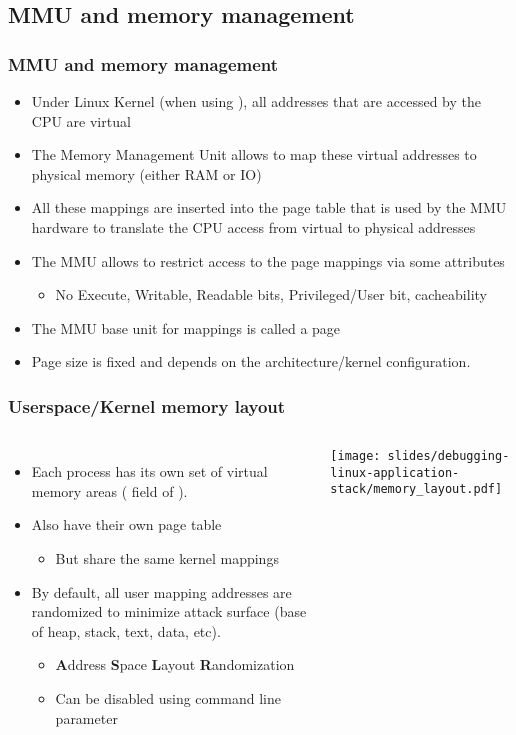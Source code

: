\subsection{MMU and memory management}

\begin{frame}
  \frametitle{MMU and memory management}
  \begin{itemize}
    \item Under Linux Kernel (when using ), all addresses
          that are accessed by the CPU are virtual
    \item The Memory Management Unit allows to map these virtual addresses to
          physical memory (either RAM or IO)
    \item All these mappings are inserted into the page table that is used
          by the MMU hardware to translate the CPU access from virtual to
          physical addresses
    \item The MMU allows to restrict access to the page mappings via some
          attributes
    \begin{itemize}
      \item No Execute, Writable, Readable bits, Privileged/User bit, cacheability
    \end{itemize}
    \item The MMU base unit for mappings is called a page
    \item Page size is fixed and depends on the architecture/kernel
          configuration.
  \end{itemize}
\end{frame}

\begin{frame}
  \frametitle{Userspace/Kernel memory layout}
  \begin{columns}
    \begin{itemize}
      \item Each process has its own set of virtual memory areas (
            field of ).
      \item Also have their own page table
      \begin{itemize}
        \item But share the same kernel mappings
      \end{itemize}
      \item By default, all user mapping addresses are randomized to
            minimize attack surface (base of heap, stack, text, data, etc).
      \begin{itemize}
        \item {\bf A}ddress {\bf S}pace {\bf L}ayout {\bf R}andomization
        \item Can be disabled using  command line parameter
      \end{itemize}
    \end{itemize}
    \texttt{[image: slides/debugging-linux-application-stack/memory\_layout.pdf]}
  \end{columns}
\end{frame}

